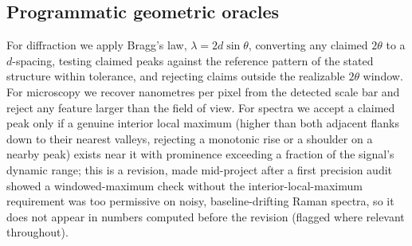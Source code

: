 \documentclass[pdflatex,sn-nature]{sn-jnl}
\begin{document}
\subsection*{Programmatic geometric oracles}
For diffraction we apply Bragg's law, $\lambda = 2 d \sin\theta$, converting any
claimed $2\theta$ to a $d$-spacing, testing claimed peaks against the reference
pattern of the stated structure within tolerance, and rejecting claims outside the
realizable $2\theta$ window. For microscopy we recover nanometres per pixel from the
detected scale bar and reject any feature larger than the field of view. For spectra
we accept a claimed peak only if a genuine interior local maximum (higher than both
adjacent flanks down to their nearest valleys, rejecting a monotonic rise or a shoulder on
a nearby peak) exists near it with prominence exceeding a fraction of the signal's dynamic
range; this is a revision, made mid-project after a first precision audit showed a
windowed-maximum check without the interior-local-maximum requirement was too permissive
on noisy, baseline-drifting Raman spectra, so it does not appear in numbers computed
before the revision (flagged where relevant throughout).
\end{document}
